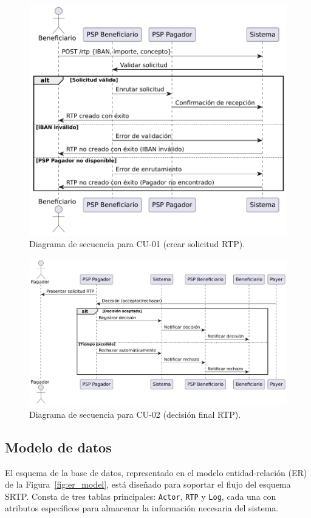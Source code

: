 \begin{figure}[htbp]
  \centering
  \includegraphics[width=.9\textwidth]{Imagenes/CU01.pdf}
  \caption{Diagrama de secuencia para CU‑01 (crear solicitud RTP).}
  \label{fig:seq_cu01}
\end{figure}

\begin{figure}[htbp]
  \centering
  \includegraphics[width=.9\textwidth]{Imagenes/CU02.pdf}
  \caption{Diagrama de secuencia para CU‑02 (decisión final RTP).}
  \label{fig:seq_cu02}
\end{figure}

\subsection{Modelo de datos}
\label{subsec:diseno_datos}

El esquema de la base de datos, representado en el modelo entidad-relación (ER) de la Figura~\ref{fig:er_model}, está diseñado para soportar el flujo del esquema SRTP. Consta de tres tablas principales: \texttt{Actor}, \texttt{RTP} y \texttt{Log}, cada una con atributos específicos para almacenar la información necesaria del sistema.

